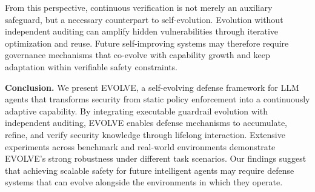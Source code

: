 From this perspective, continuous verification is not merely an auxiliary safeguard, but a necessary counterpart to self-evolution. Evolution without independent auditing can amplify hidden vulnerabilities through iterative optimization and reuse. Future self-improving systems may therefore require governance mechanisms that co-evolve with capability growth and keep adaptation within verifiable safety constraints.


\textbf{Conclusion.} We present EVOLVE, a self-evolving defense framework for LLM agents that transforms security from static policy enforcement into a continuously adaptive capability. By integrating executable guardrail evolution with independent auditing, EVOLVE enables defense mechanisms to accumulate, refine, and verify security knowledge through lifelong interaction. Extensive experiments across benchmark and real-world environments demonstrate EVOLVE's strong robustness under different task scenarios. Our findings suggest that achieving scalable safety for future intelligent agents may require defense systems that can evolve alongside the environments in which they operate.





